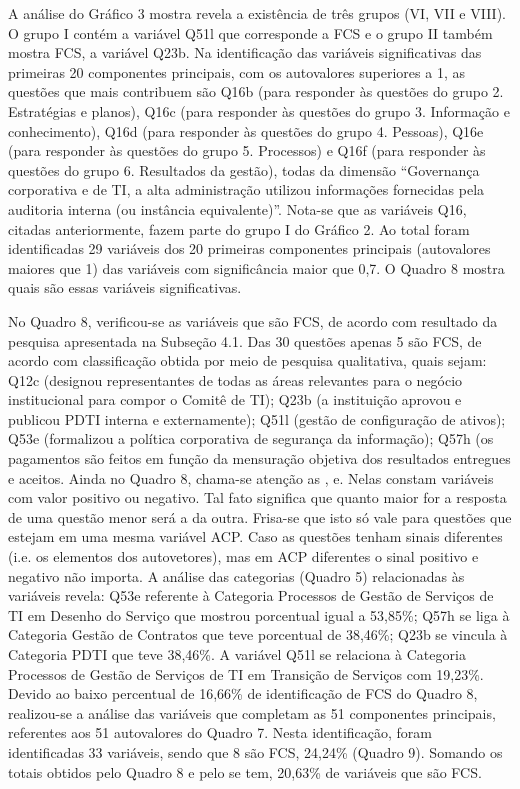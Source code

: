 A análise do Gráfico 3 mostra revela a existência de três grupos (VI, VII e VIII). O grupo I contém a variável Q51l que corresponde a FCS e o grupo II também mostra FCS, a variável Q23b.
Na identificação das variáveis significativas das primeiras 20 componentes principais, com os autovalores superiores a 1, as questões que mais contribuem são Q16b (para responder às questões do grupo 2. Estratégias e planos), Q16c (para responder às questões do grupo 3. Informação e conhecimento), Q16d (para responder às questões do grupo 4. Pessoas), Q16e (para responder às questões do grupo 5. Processos) e Q16f (para responder às questões do grupo 6. Resultados da gestão), todas da dimensão “Governança corporativa e de TI, a alta administração utilizou informações fornecidas pela auditoria interna (ou instância equivalente)”. Nota-se que as variáveis Q16, citadas anteriormente, fazem parte do grupo I do Gráfico 2. Ao total foram identificadas 29 variáveis dos 20 primeiras componentes principais (autovalores maiores que 1) das variáveis com significância maior que 0,7. O Quadro 8 mostra quais são essas variáveis significativas. 

No Quadro 8, verificou-se as variáveis que são FCS, de acordo com resultado da pesquisa apresentada na Subseção 4.1. Das 30 questões apenas 5 são FCS, de acordo com classificação obtida por meio de pesquisa qualitativa, quais sejam: Q12c (designou representantes de todas as áreas relevantes para o negócio institucional para compor o Comitê de TI); Q23b (a instituição aprovou e  publicou PDTI interna e externamente); Q51l (gestão de configuração de ativos); Q53e (formalizou a política corporativa de segurança da informação); Q57h (os pagamentos são feitos em função da mensuração objetiva dos resultados entregues e aceitos.
Ainda no Quadro 8, chama-se atenção as ,  e. Nelas constam variáveis com valor positivo ou negativo. Tal fato significa que quanto maior for a resposta de uma questão menor será a da outra. Frisa-se que isto só vale para questões que estejam em uma mesma variável ACP. Caso as questões tenham sinais diferentes (i.e. os elementos dos autovetores), mas em ACP diferentes o sinal positivo e negativo não importa. 
A análise das categorias (Quadro 5) relacionadas às variáveis revela: Q53e referente à Categoria Processos de Gestão de Serviços de TI em Desenho do Serviço que mostrou porcentual igual a 53,85\%; Q57h se liga à Categoria Gestão de Contratos que teve porcentual de 38,46\%; Q23b se vincula à Categoria PDTI que teve 38,46\%. A variável Q51l se relaciona à Categoria Processos de Gestão de Serviços de TI em Transição de Serviços com 19,23\%.
Devido ao baixo percentual de 16,66\% de identificação de FCS do Quadro 8, realizou-se a análise das variáveis que completam as 51 componentes principais, referentes aos 51 autovalores do Quadro 7. Nesta identificação, foram identificadas 33 variáveis, sendo que 8 são FCS, 24,24\% (Quadro 9). Somando os totais obtidos pelo Quadro 8 e pelo se tem, 20,63\% de variáveis que são FCS.


